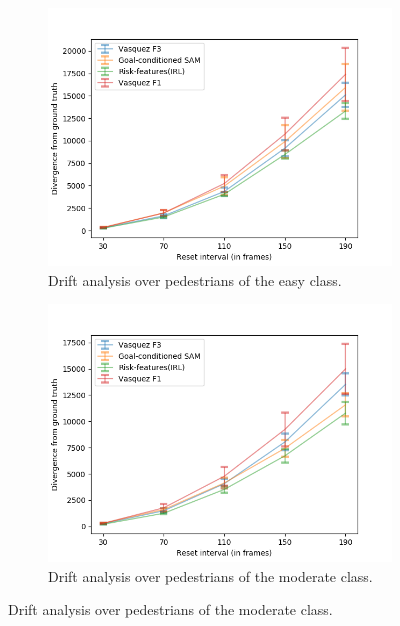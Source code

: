 \begin{figure}[htbp]
	\begin{subfigure}{0.5\textwidth}
		\centering
		\includegraphics[width=\linewidth]{plots/ucy_inter_irl_new/drift_easy_ucy_inter_irl.png}
		\caption {Drift analysis over pedestrians of the easy class.}
		\label{fig:inter_IRL-drift_analysis_easy}
	\end{subfigure}
	\begin{subfigure}{0.5\textwidth}
		\centering
		\includegraphics[width=\linewidth]{plots/ucy_inter_irl_new/drift_med_ucy_inter_irl.png}
		\caption {Drift analysis over pedestrians of the moderate class.}
		\label{fig:inter_IRL-drift_analysis_med}
	\end{subfigure}

\end{figure}
